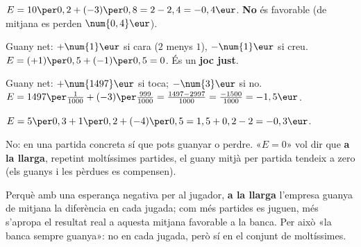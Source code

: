 \begin{solucions}
\begin{sollist}
  \item $E = 10\per 0,2 + (-3)\per 0,8 = 2 - 2,4 = -0,4\eur$. \textbf{No} és favorable
        (de mitjana es perden $\num{0,4}\eur$).
  \item Guany net: $+\num{1}\eur$ si cara ($2$ menys $1$), $-\num{1}\eur$ si creu.
        $E = (+1)\per 0,5 + (-1)\per 0,5 = 0$. És un \textbf{joc just}.
  \item Guany net: $+\num{1497}\eur$ si toca; $-\num{3}\eur$ si no.
        $E = 1497\per\frac{1}{1000} + (-3)\per\frac{999}{1000}=\frac{1497-2997}{1000}
        =\frac{-1500}{1000}=-1,5\eur$.
  \item $E = 5\per 0,3 + 1\per 0,2 + (-4)\per 0,5 = 1,5 + 0,2 - 2 = -0,3\eur$.
  \item No: en una partida concreta sí que pots guanyar o perdre. «$E=0$» vol dir que
        \textbf{a la llarga}, repetint moltíssimes partides, el guany mitjà per partida
        tendeix a zero (els guanys i les pèrdues es compensen).
  \item Perquè amb una esperança negativa per al jugador, \textbf{a la llarga}
        l'empresa guanya de mitjana la diferència en cada jugada; com més partides es
        juguen, més s'apropa el resultat real a aquesta mitjana favorable a la banca.
        Per això «la banca sempre guanya»: no en cada jugada, però sí en el conjunt de
        moltíssimes.
\end{sollist}
\end{solucions}
